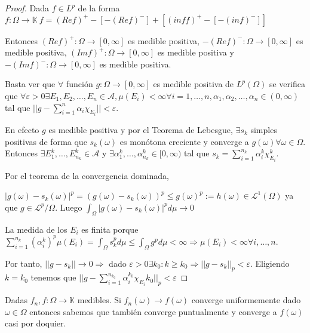 \documentclass[11pt, a4paper]{article}
\theoremstyle{theorem-style}
\theoremstyle{definition-style}
\theoremstyle{remark-style}
\theoremstyle{example-style}
\begin{document}
\begin{proof}
  Dada $f \in L^{p}$ de la forma $f: \Omega \rightarrow \mathbb K \ f =
  (Ref)^{+} - [-(Ref)^{-}] + [(inf f)^{+}- [-(inf)^{-}]]$

  Entonces $(Ref)^{+}: \Omega \rightarrow [0, \infty]$ es medible positiva,
  $-(Ref)^{-}: \Omega \rightarrow [0, \infty]$ es medible positiva, $(Imf)^{+}:
  \Omega \rightarrow [0, \infty]$ es medible positiva y $-(Imf)^{-}: \Omega
  \rightarrow [0, \infty]$ es medible positiva.

  Basta ver que $\forall$ función $g: \Omega \rightarrow [0, \infty]$ es medible
  positiva de $L^{p}(\Omega)$ se verifica que $\forall \varepsilon > 0 \exists
  E_{1}, E_{2}, \hdots,E_{n} \in \mathcal A, \mu(E_{i}) < \infty \forall i = 1,
  \hdots, n, \alpha_{1}, \alpha_{2}, \hdots, \alpha_{n} \in (0, \infty)$ tal que
  $||g - \sum_{i=1}^{n} \alpha_{i}\chi_{E_{i}}|| < \varepsilon$.

  En efecto $g$ es medible positiva y por el Teorema de Lebesgue, $\exists
  {s_{k}}$ simples positivas de forma que $s_{k}(\omega)$ es monótona creciente
  y converge a $g(\omega) \forall \omega \in \Omega$. Entonces $\exists
  E_{1}^{k}, \hdots, E_{n_{k}}^{k} \in \mathcal A$ y $\exists \alpha_{1}^{k},
  \hdots, \alpha_{n_{k}}^{k} \in [0, \infty)$ tal que $s_{k} =
  \sum_{i=1}^{n_{k}}\alpha_{i}^{k}\chi_{E_{i}}^{k}$.

  Por el teorema de la convergencia dominada,

  $|g(\omega) - s_{k}(\omega)|^{p} = (g(\omega) - s_{k}(\omega))^{p} \leq
  g(\omega)^{p}:= h(\omega) \in \mathcal L^{1}(\Omega)$ ya que $g \in \mathcal
  L^{p}/\Omega$. Luego $\int_{\Omega}|g(\omega) - s_{k}(\omega)|^{p}d\mu
  \rightarrow 0$

  La medida de los $E_{i}$ es finita porque
  $\sum_{i=1}^{n_{k}}(\alpha_{i}^{k})^{p}\mu(E_{i}) = \int_{\Omega}s_{k}^{p}d\mu
  \leq \int_{\Omega}g^{p}d\mu < \infty \Rightarrow \mu(E_{i}) < \infty \forall
  i, \hdots, n$.

  Por tanto, $||g-s_{k}|| \rightarrow 0 \Rightarrow$ dado $\varepsilon > 0
  \exists k_{0} : k  \geq k_{0} \Rightarrow ||g-s_{k}||_{p} <
  \varepsilon$. Eligiendo $k = k_{0}$ tenemos que $||g -
  \sum_{i=1}^{n_{k_{0}}}\alpha_{i}^{k_{0}}\chi_{E_{i}}k_{0}||_{p} < \varepsilon$
\end{proof}

Dadas $f_{n}, f : \Omega \rightarrow \mathbb K$ medibles. Si ${f_{n}(\omega)}
\rightarrow f(\omega)$ converge uniformemente dado $\omega \in \Omega$ entonces
sabemos que también converge puntualmente y converge a $f(\omega)$ casi por
doquier.
\end{document}
